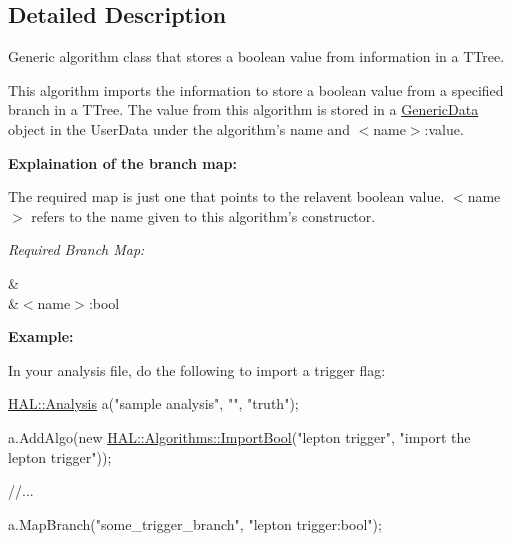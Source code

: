 \subsection{Detailed Description}
Generic algorithm class that stores a boolean value from information in a T\-Tree. 

This algorithm imports the information to store a boolean value from a specified branch in a T\-Tree. The value from this algorithm is stored in a \hyperlink{class_h_a_l_1_1_generic_data}{Generic\-Data} object in the User\-Data under the algorithm's name and $<$name$>$\-:value.\par
\par
 {\bfseries Explaination of the branch map\-:}\par
 The required map is just one that points to the relavent boolean value. $<$name$>$ refers to the name given to this algorithm's constructor.\par
 {\itshape Required Branch Map\-:} \begin{TabularC}{2}
\hline
{}&\PBS{}\\
&\PBS\centering $<$name$>$\-:bool \\
\end{TabularC}
{\bfseries Example\-:}\par
 In your analysis file, do the following to import a trigger flag\-:


\begin{DoxyCode}
\hyperlink{class_h_a_l_1_1_analysis}{HAL::Analysis} a(\textcolor{stringliteral}{"sample analysis"}, \textcolor{stringliteral}{""}, \textcolor{stringliteral}{"truth"});

a.AddAlgo(\textcolor{keyword}{new} \hyperlink{class_h_a_l_1_1_algorithms_1_1_import_bool}{HAL::Algorithms::ImportBool}(\textcolor{stringliteral}{"lepton trigger"}, \textcolor{stringliteral}{"import the lepton
       trigger"}));

\textcolor{comment}{//...}

a.MapBranch(\textcolor{stringliteral}{"some\_trigger\_branch"}, \textcolor{stringliteral}{"lepton trigger:bool"});
\end{DoxyCode}
 


